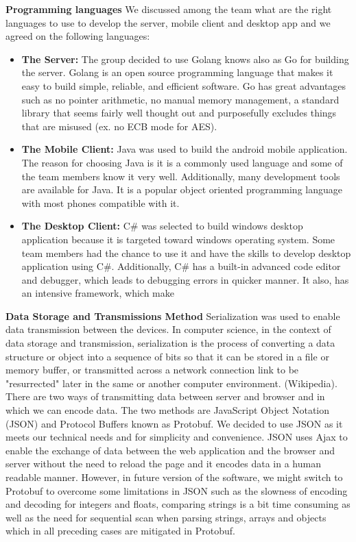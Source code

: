 \documentclass{article}
\begin{document}
\newline
\hfill \break
\textbf{Programming languages}
We discussed among the team what are the right languages to use to develop the server, mobile client and desktop app and we agreed on the following languages:
\begin{itemize}
\item\textbf{The Server:} The group decided to use Golang knows also as Go for building the server. Golang is an open source programming language that makes it easy to build simple, reliable, and efficient software. Go has great advantages such as no pointer arithmetic, no manual memory management, a standard library that seems fairly well thought out and purposefully excludes things that are misused (ex. no ECB mode for AES).
\item\textbf{The Mobile Client:} Java was used to build the android mobile application. The reason for choosing Java is it is a commonly used language and some of the team members know it very well.
Additionally, many development tools are available for Java. It is a popular object oriented programming language with most phones compatible with it.
\item\textbf{The Desktop Client:} C# was selected to build windows desktop application because it is targeted toward windows operating system. Some team members had the chance to use it and have the skills to develop desktop application using C#. Additionally, C# has a built-in advanced code editor and debugger, which leads to debugging errors in quicker manner. It also, has an intensive framework, which make
\end{itemize}
\newline
\hfill \break
\textbf{Data Storage and Transmissions Method}
Serialization was used to enable data transmission between the devices. In computer science, in the context of data storage and transmission, serialization is the process of converting a data structure or object into a sequence of bits so that it can be stored in a file or memory buffer, or transmitted across a network connection link to be "resurrected" later in the same or another computer environment. (Wikipedia). There are two ways of transmitting data between server and browser and in which we can encode data. The two methods are JavaScript Object Notation
(JSON) and Protocol Buffers known as Protobuf. We decided to use JSON as it meets our technical needs and for simplicity and convenience. JSON uses Ajax to enable the exchange of data between the web application and the browser and server without the need to reload the page and it encodes data in a human readable manner. However, in future version of the software, we might switch to Protobuf to overcome some limitations in JSON such as the slowness of encoding and decoding for integers and floats, comparing strings is a bit time consuming as well as the need for sequential scan when parsing strings, arrays and objects which in all preceding cases are mitigated in Protobuf.
\end{document}

